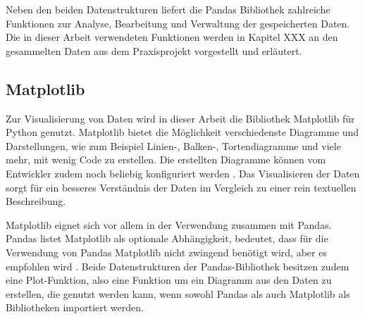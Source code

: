 Neben den beiden Datenstrukturen liefert die Pandas Bibliothek zahlreiche Funktionen zur Analyse, Bearbeitung und Verwaltung der gespeicherten Daten. Die in dieser Arbeit 
verwendeten Funktionen werden in Kapitel XXX an den gesammelten Daten aus dem Praxisprojekt vorgestellt und erläutert.

\subsection{Matplotlib}
Zur Visualisierung von Daten wird in dieser Arbeit die Bibliothek Matplotlib für Python genutzt. Matplotlib bietet die Möglichkeit verschiedenste Diagramme und Darstellungen,
wie zum Beispiel Linien-, Balken-, Tortendiagramme und viele mehr, mit wenig Code zu erstellen. Die erstellten Diagramme können vom Entwickler zudem noch beliebig 
konfiguriert werden \cite[vgl. S.167.]{NumerischesPython}. Das Visualisieren der Daten sorgt für ein besseres Verständnis der Daten im Vergleich zu einer rein textuellen Beschreibung.

Matplotlib eignet sich vor allem in der Verwendung zusammen mit Pandas. Pandas listet Matplotlib als \glqq optionale Abhängigkeit\grqq{}, bedeutet, dass für die Verwendung
von Pandas Matplotlib nicht zwingend benötigt wird, aber es empfohlen wird \cite[vgl. S.253]{NumerischesPython}.
Beide Datenstrukturen der Pandas-Bibliothek besitzen zudem eine Plot-Funktion, also eine Funktion um ein Diagramm aus den Daten zu erstellen, 
die genutzt werden kann, wenn sowohl Pandas als auch Matplotlib als Bibliotheken importiert werden.